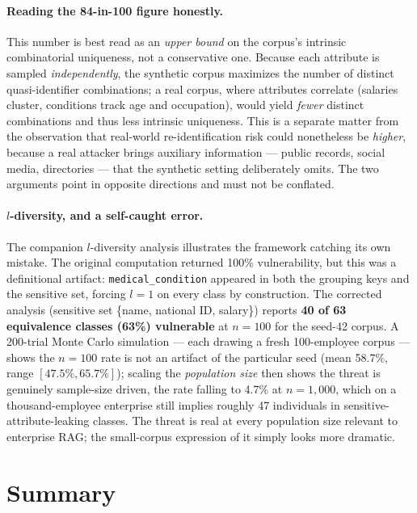 \documentclass[11pt,a4paper]{report}
\begin{document}
\paragraph{Reading the 84-in-100 figure honestly.} This number is best read as an \emph{upper
bound} on the corpus's intrinsic combinatorial uniqueness, not a conservative one. Because each
attribute is sampled \emph{independently}, the synthetic corpus maximizes the number of distinct
quasi-identifier combinations; a real corpus, where attributes correlate (salaries cluster,
conditions track age and occupation), would yield \emph{fewer} distinct combinations and thus
less intrinsic uniqueness. This is a separate matter from the observation that real-world
re-identification risk could nonetheless be \emph{higher}, because a real attacker brings
auxiliary information --- public records, social media, directories --- that the synthetic setting
deliberately omits. The two arguments point in opposite directions and must not be conflated.

\paragraph{$l$-diversity, and a self-caught error.} The companion $l$-diversity analysis
illustrates the framework catching its own mistake. The original computation returned 100\%
vulnerability, but this was a definitional artifact: \texttt{medical\_condition} appeared in both
the grouping keys and the sensitive set, forcing $l = 1$ on every class by construction. The
corrected analysis (sensitive set \{name, national ID, salary\}) reports \textbf{40 of 63
equivalence classes (63\%) vulnerable} at $n = 100$ for the seed-42 corpus. A 200-trial Monte
Carlo simulation --- each drawing a fresh 100-employee corpus --- shows the $n = 100$ rate is not
an artifact of the particular seed (mean 58.7\%, range $[47.5\%, 65.7\%]$); scaling the
\emph{population size} then shows the threat is genuinely sample-size driven, the rate falling to
4.7\% at $n = 1{,}000$, which on a thousand-employee enterprise still implies roughly 47
individuals in sensitive-attribute-leaking classes. The threat is real at every population size
relevant to enterprise RAG; the small-corpus expression of it simply looks more dramatic.


\section{Summary}
\label{sec:ch3-formal-summary}
\end{document}

